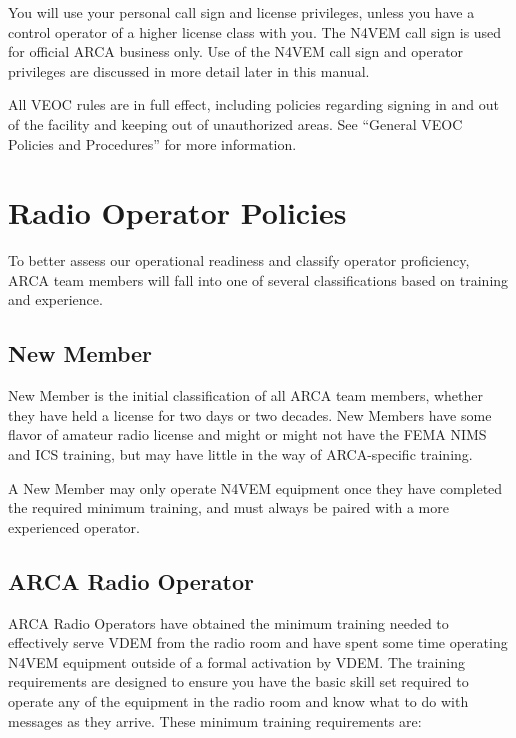 \documentclass[pdflatex,letterpaper,twoside,12pt]{book}
\begin{document}
You will use your personal call sign and license privileges, unless you have a control operator of a higher license class with you.  The N4VEM call sign is used for official ARCA business only.  Use of the N4VEM call sign and operator privileges are discussed in more detail later in this manual.

All VEOC rules are in full effect, including policies regarding signing in and out of the facility and keeping out of unauthorized areas.  See ``General VEOC Policies and Procedures'' for more information.


\section{Radio Operator Policies}

To better assess our operational readiness and classify operator proficiency, ARCA team members will fall into one of several classifications based on training and experience.

\subsection{New Member}

New Member is the initial classification of all ARCA team members, whether they have held a license for two days or two decades.  New Members have some flavor of amateur radio license and might or might not have the FEMA NIMS and ICS training, but may have little in the way of ARCA-specific training.

A New Member may only operate N4VEM equipment once they have completed the required minimum training, and must always be paired with a more experienced operator.

\subsection{ARCA Radio Operator}

ARCA Radio Operators have obtained the minimum training needed to effectively serve VDEM from the radio room and have spent some time operating N4VEM equipment outside of a formal activation by VDEM.  The training requirements are designed to ensure you have the basic skill set required to operate any of the equipment in the radio room and know what to do with messages as they arrive.  These minimum training requirements are:
\end{document}
